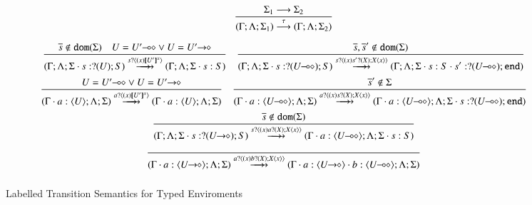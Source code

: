 \begin{figure}
\[\begin{array}{c}
		\tree{
			\Sigma_1 \red \Sigma_2
		}{
			(\Gamma; \Lambda; \Sigma_1) \by{\tau} (\Gamma; \Lambda; \Sigma_2)
		}



	\end{array}
	\]

	\[
	\begin{array}{c}

		\tree{
			\dual{s} \notin \dom{\Sigma} \quad U = \lhot{U'} \vee U = \shot{U'}
		}{
			(\Gamma; \Lambda; \Sigma \cat s: \btinp{U} S) \hby{\bactinp{s}{\abs{x}{\map{U'}^x}}} (\Gamma; \Lambda; \Sigma \cat s: S)
		}
		\quad
		\tree{
			\dual{s}, \dual{s}' \notin \dom{\Sigma}
		}{
			(\Gamma; \Lambda; \Sigma \cat s: \btinp{\lhot{U}} S) \hby{\bactinp{s}{\abs{x}{\binp{s'}{X} \appl{X}{x}}}} (\Gamma; \Lambda; \Sigma \cat s: S \cat s': \btinp{\lhot{U}} \tinact)
		}
		\\[6mm]

		\tree{
			U = \lhot{U'} \vee U = \shot{U'}
		}{
		(\Gamma \cat a: \chtype{U}; \Lambda; \Sigma) \hby{\bactinp{a}{\abs{x}{\map{U'}^x}}} (\Gamma \cat a: \chtype{U}; \Lambda; \Sigma)
		}
		\quad
		\tree{
			\dual{s}' \notin \Sigma
		}{
		(\Gamma \cat a: \chtype{\lhot{U}}; \Lambda; \Sigma) \hby{\bactinp{a}{\abs{x}{\binp{s}{X} \appl{X}{x}}}} (\Gamma \cat a: \chtype{\lhot{U}}; \Lambda; \Sigma \cat s: \btinp{\lhot{U}}
 \tinact)
		}
		\\[6mm]

		\tree{
			\dual{s} \notin \dom{\Sigma}
		}{
			(\Gamma; \Lambda; \Sigma \cat s: \btinp{\shot{U}} S) \hby{\bactinp{s}{\abs{x}{\binp{a}{X} \appl{X}{x}}}} (\Gamma \cat a: \chtype{\lhot{U}}; \Lambda; \Sigma \cat s: S)
		}
		\\[6mm]
		\tree{
		}{
			(\Gamma \cat a: \chtype{\shot{U}}; \Lambda; \Sigma) \hby{\bactinp{a}{\abs{x}{\binp{b}{X} \appl{X}{x}}}} (\Gamma \cat a: \chtype{\shot{U}} \cat b: \chtype{\lhot{U}}; \Lambda; \Sigma)
		}
		\\[6mm]
	\end{array}
	\]
	\caption{Labelled Transition Semantics for Typed Enviroments \label{fig:envLTS}}
\end{figure}
